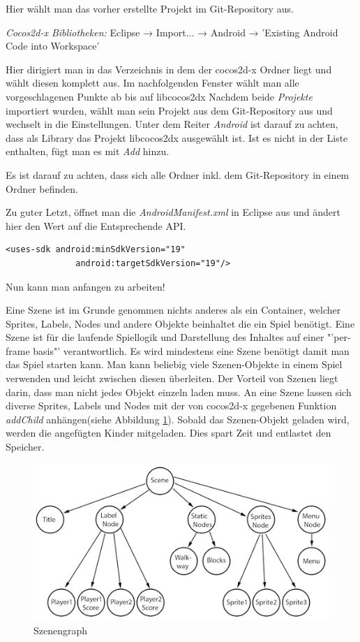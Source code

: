 Hier wählt man das vorher erstellte Projekt im Git-Repository aus.

	\textit{Cocos2d-x Bibliotheken:} Eclipse → Import... → Android → 'Existing Android Code into 	Workspace'

Hier dirigiert man in das Verzeichnis in dem der cocos2d-x Ordner liegt und wählt diesen komplett aus. Im nachfolgenden Fenster wählt man alle vorgeschlagenen Punkte ab bis auf libcocos2dx Nachdem beide \textit{Projekte} importiert wurden, wählt man sein Projekt aus dem Git-Repository aus und wechselt in die Einstellungen. Unter dem Reiter \textit{Android} ist darauf zu achten, dass als Library das Projekt libcocos2dx ausgewählt ist. Ist es nicht in der Liste enthalten, fügt man es mit \textit{Add} hinzu. 

Es ist darauf zu achten, dass sich alle Ordner inkl. dem Git-Repository in einem Ordner befinden.

Zu guter Letzt, öffnet man die \textit{AndroidManifest.xml} in Eclipse aus und ändert hier den Wert auf die Entsprechende API.
\begin{lstlisting}[style=singleline]
	<uses-sdk android:minSdkVersion="19"
			  android:targetSdkVersion="19"/>
\end{lstlisting}
	

Nun kann man anfangen zu arbeiten! 



\label{sec:2_Szenenprinzip}
Eine Szene ist im Grunde genommen nichts anderes als ein Container, welcher  Sprites, Labels, Nodes und andere Objekte beinhaltet die ein Spiel benötigt. Eine Szene ist für die laufende Spiellogik und Darstellung des Inhaltes auf einer "'per-frame basis"' verantwortlich. Es wird mindestens eine Szene benötigt damit man das Spiel starten kann. Man kann beliebig viele Szenen-Objekte in einem Spiel verwenden und leicht zwischen diesen überleiten. Der Vorteil von Szenen liegt darin, dass man nicht jedes Objekt einzeln laden muss. An eine Szene lassen sich diverse Sprites, Labels und Nodes mit der von cocos2d-x gegebenen Funktion \textit{addChild} anhängen(siehe Abbildung \ref{fig:szenengraph}). Sobald das Szenen-Objekt geladen wird, werden die angefügten Kinder mitgeladen. Dies spart Zeit und entlastet den Speicher.

\begin{figure}[H]
  \centering
  \includegraphics[width=12cm]{resources/scenegraph}
  \caption{Szenengraph}
  \label{fig:szenengraph} 
\end{figure}


